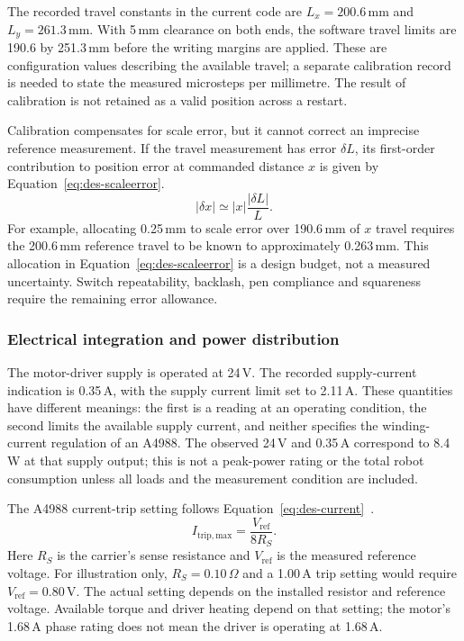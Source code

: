 The recorded travel constants in the current code are $L_x=200.6$\,mm and $L_y=261.3$\,mm. With 5\,mm clearance on both ends, the software travel limits are 190.6 by 251.3\,mm before the writing margins are applied. These are configuration values describing the available travel; a separate calibration record is needed to state the measured microsteps per millimetre. The result of calibration is not retained as a valid position across a restart.

Calibration compensates for scale error, but it cannot correct an imprecise reference measurement. If the travel measurement has error $\delta L$, its first-order contribution to position error at commanded distance $x$ is given by Equation~\ref{eq:des-scaleerror}.
\begin{equation}
|\delta x|\simeq |x|\frac{|\delta L|}{L}.
\label{eq:des-scaleerror}
\end{equation}
For example, allocating 0.25\,mm to scale error over 190.6\,mm of $x$ travel requires the 200.6\,mm reference travel to be known to approximately 0.263\,mm. This allocation in Equation~\ref{eq:des-scaleerror} is a design budget, not a measured uncertainty. Switch repeatability, backlash, pen compliance and squareness require the remaining error allowance.

\subsubsection{Electrical integration and power distribution}
\label{sec:des-power}
The motor-driver supply is operated at 24\,V. The recorded supply-current indication is 0.35\,A, with the supply current limit set to 2.11\,A. These quantities have different meanings: the first is a reading at an operating condition, the second limits the available supply current, and neither specifies the winding-current regulation of an A4988. The observed 24\,V and 0.35\,A correspond to 8.4\,W at that supply output; this is not a peak-power rating or the total robot consumption unless all loads and the measurement condition are included.

The A4988 current-trip setting follows Equation~\ref{eq:des-current}~\cite[p.~9]{a4988ds}.
\begin{equation}
I_{\mathrm{trip,max}}=\frac{V_{\mathrm{ref}}}{8R_S}.
\label{eq:des-current}
\end{equation}
Here $R_S$ is the carrier's sense resistance and $V_{\mathrm{ref}}$ is the measured reference voltage. For illustration only, $R_S=0.10\,\Omega$ and a 1.00\,A trip setting would require $V_{\mathrm{ref}}=0.80$\,V. The actual setting depends on the installed resistor and reference voltage. Available torque and driver heating depend on that setting; the motor's 1.68\,A phase rating does not mean the driver is operating at 1.68\,A.

